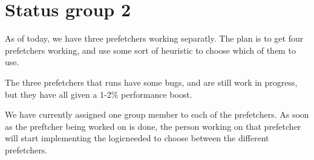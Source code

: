 \documentclass[a4paper,10pt,titlepage]{article}
\begin{document}
\section{Status group 2}
As of today, we have three prefetchers working separatly. The plan is to get four prefetchers working, and use some sort of heuristic to choose which of them to use.

The three prefetchers that runs have some bugs, and are still work in progress, but they have all given a 1-2\% performance boost.

We have currently assigned one group member to each of the prefetchers. As soon as the preftcher being worked on is done, the person working on that prefetcher will start implementing the logicneeded to choose between the different prefetchers.
\end{document}
